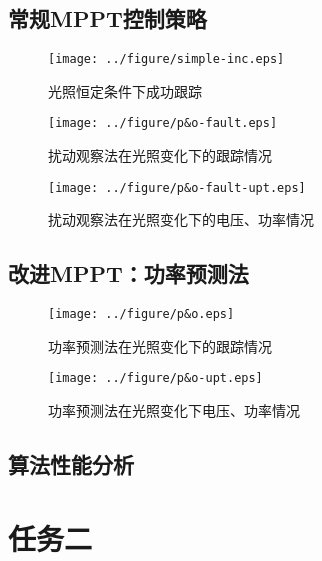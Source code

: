 \documentclass[a4paper,12pt]{article}
\begin{document}
    \subsection{常规MPPT控制策略} %
    \label{sub:常规mppt控制策略}
    \begin{figure}[htbp]
        \centering
        \texttt{[image: ../figure/simple-inc.eps]}
        \caption{光照恒定条件下成功跟踪}
        \label{fig:simple-inc}
    \end{figure}
    \begin{figure}[htbp]
        \centering
        \texttt{[image: ../figure/p\&o-fault.eps]}
        \caption{扰动观察法在光照变化下的跟踪情况}
        \label{fig:po-fault}
    \end{figure}
    \begin{figure}[htbp]
        \centering
        \texttt{[image: ../figure/p\&o-fault-upt.eps]}
        \caption{扰动观察法在光照变化下的电压、功率情况}
        \label{fig:po-fault-upt}
    \end{figure}
    \subsection{改进MPPT：功率预测法} %
    \label{sub:改进mppt_功率预测法}
    \begin{figure}[htbp]
        \centering
        \texttt{[image: ../figure/p\&o.eps]}
        \caption{功率预测法在光照变化下的跟踪情况}
        \label{fig:po}
    \end{figure}
    \begin{figure}[htbp]
        \centering
        \texttt{[image: ../figure/p\&o-upt.eps]}
        \caption{功率预测法在光照变化下电压、功率情况}
        \label{fig:po-upt}
    \end{figure}
    \subsection{算法性能分析} %
    \label{sub:算法性能分析}
    
    \section{任务二} %
    \label{sec:任务二}
\end{document}
